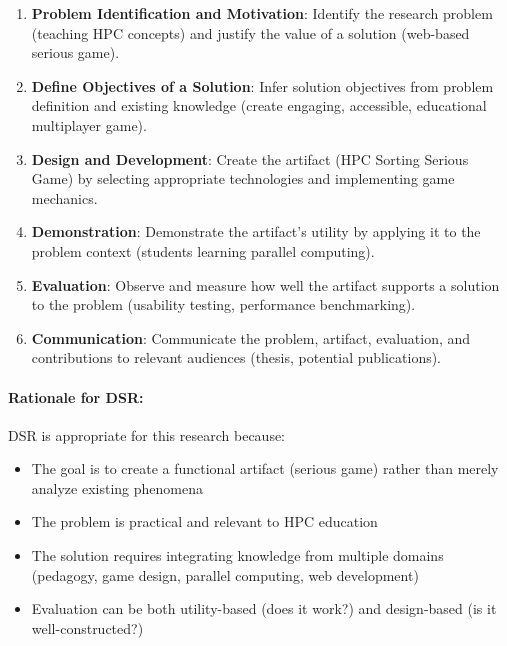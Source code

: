 \begin{enumerate}
    \item \textbf{Problem Identification and Motivation}: Identify the research problem (teaching HPC concepts) and justify the value of a solution (web-based serious game).

    \item \textbf{Define Objectives of a Solution}: Infer solution objectives from problem definition and existing knowledge (create engaging, accessible, educational multiplayer game).

    \item \textbf{Design and Development}: Create the artifact (HPC Sorting Serious Game) by selecting appropriate technologies and implementing game mechanics.

    \item \textbf{Demonstration}: Demonstrate the artifact's utility by applying it to the problem context (students learning parallel computing).

    \item \textbf{Evaluation}: Observe and measure how well the artifact supports a solution to the problem (usability testing, performance benchmarking).

    \item \textbf{Communication}: Communicate the problem, artifact, evaluation, and contributions to relevant audiences (thesis, potential publications).
\end{enumerate}

\paragraph*{Rationale for DSR:}

DSR is appropriate for this research because:

\begin{itemize}
    \item The goal is to create a functional artifact (serious game) rather than merely analyze existing phenomena
    \item The problem is practical and relevant to HPC education
    \item The solution requires integrating knowledge from multiple domains (pedagogy, game design, parallel computing, web development)
    \item Evaluation can be both utility-based (does it work?) and design-based (is it well-constructed?)
\end{itemize}


